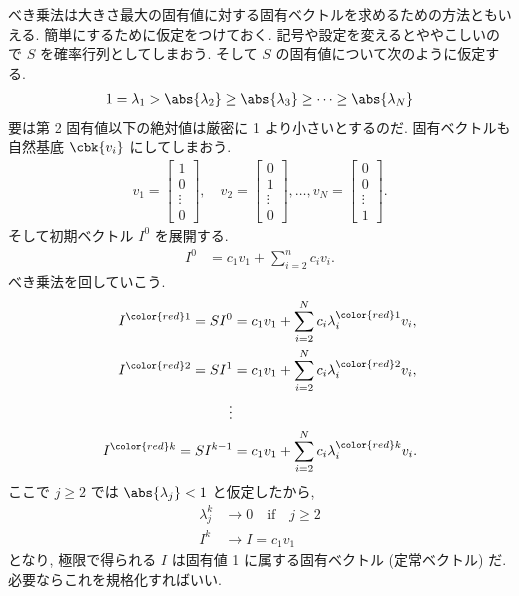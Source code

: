 \documentclass[openany, a4paper, oneside]{jsbook}
\begin{document}
べき乗法は大きさ最大の固有値に対する固有ベクトルを求めるための方法ともいえる.
簡単にするために仮定をつけておく.
記号や設定を変えるとややこしいので $S$ を確率行列としてしまおう.
そして $S$ の固有値について次のように仮定する.
\begin{align}
 1
 =
 \lambda_1
 >
 \abs{ \lambda_2 }
 \geq
 \abs{ \lambda_3 }
 \geq
 \cdots
 \geq
 \abs{ \lambda_{N} }
\end{align}
要は第 2 固有値以下の絶対値は厳密に 1 より小さいとするのだ.
固有ベクトルも自然基底 $\cbk{v_i}$ にしてしまおう.
\begin{align}
 v_1
 =
 \begin{bmatrix}
 1 \\
 0 \\
 \vdots \\
 0
 \end{bmatrix}
 , \quad
 v_2
 =
 \begin{bmatrix}
 0 \\
 1 \\
 \vdots \\
 0
 \end{bmatrix}
 , \dots,
 v_N
 =
 \begin{bmatrix}
 0 \\
 0 \\
 \vdots \\
 1
 \end{bmatrix}
 .
\end{align}
そして初期ベクトル $I^0$ を展開する.
\begin{align}
 I^0
 &=
 c_1 v_1 + \sum_{i=2}^n c_i v_i.
\end{align}
べき乗法を回していこう.
\begin{align}
 I^{\color{red}1}
 =
 S I^0
 &=
 c_1 v_1 + \sum_{i=2}^N c_i \lambda_{i}^{\color{red}1} v_i, \\
 I^{\color{red}2}
 =
 S I^1
 &=
 c_1 v_1 + \sum_{i=2}^N c_i \lambda_{i}^{\color{red}2} v_i, \\
 \vdots\\
 I^{\color{red}k}
 =
 S I^{k-1}
 &=
 c_1 v_1 + \sum_{i=2}^N c_i \lambda_{i}^{\color{red}k} v_i.
\end{align}
ここで $j \geq 2$ では $\abs{\lambda_j} < 1$ と仮定したから,
\begin{align}
 \lambda_j^k &\to 0 \quad \text{if} \quad j \geqslant 2 \\
 I^k &\to I = c_1 v_1
\end{align}
となり, 極限で得られる $I$ は固有値 1 に属する固有ベクトル (定常ベクトル) だ.
必要ならこれを規格化すればいい.
\end{document}
